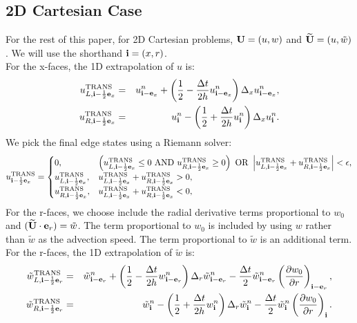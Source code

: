 \documentclass[11pt]{article}
\def\half  {\frac{1}{2}}
\def\dt    {\Delta t}
\def\trans {\rm TRANS}
\def\eb    {{\bf e}}
\def\ib    {{\bf i}}
\def\Ub    {{\bf U}}
\def\Ubt   {\widetilde{\bf U}}
\def\wt    {\tilde{w}}
\begin{document}
\subsection{2D Cartesian Case}
For the rest of this paper, for 2D Cartesian problems, $\Ub = (u,w)$ and $\Ubt = (u,\wt)$.  We will use the shorthand $\ib = (x,r)$.\\

For the x-faces, the 1D extrapolation of $u$ is:
\begin{eqnarray}
u_{L,\ib-\half\eb_x}^{\trans} &=& u_{\ib-\eb_x}^n + \left(\half - \frac{\dt}{2h}u_{\ib-\eb_x}^n\right)\Delta_x u_{\ib-\eb_x}^n, \\
u_{R,\ib-\half\eb_x}^{\trans} &=& u_{\ib}^n - \left(\half + \frac{\dt}{2h}u_{\ib}^n\right)\Delta_x u_{\ib}^n.
\end{eqnarray}
We pick the final edge states using a Riemann solver:
\begin{equation}
u^{\trans}_{\ib-\half\eb_x} =
\begin{cases}
0, & \left(u_{L,\ib-\half\eb_x}^{\trans} \le 0 ~ {\rm AND} ~ u_{R,\ib-\half\eb_x}^{\trans} \ge 0\right) ~ {\rm OR} ~ \left|u_{L,\ib-\half\eb_x}^{\trans} + u_{R,\ib-\half\eb_x}^{\trans}\right| < \epsilon, \\
u_{L,\ib-\half\eb_x}^{\trans}, & u_{L,\ib-\half\eb_x}^{\trans} + u_{R,\ib-\half\eb_x}^{\trans} > 0, \\
u_{R,\ib-\half\eb_x}^{\trans}, & u_{L,\ib-\half\eb_x}^{\trans} + u_{R,\ib-\half\eb_x}^{\trans} < 0, \\
\end{cases}
\end{equation}
For the r-faces, we choose include the radial derivative terms proportional to $w_0$ and $(\Ubt\cdot\eb_r) = \wt$.  The term proportional to $w_0$ is included by using $w$ rather than $\wt$ as the advection speed.  The term proportional to $\wt$ is an additional term.  For the r-faces, the 1D extrapolation of $\wt$ is:
\begin{eqnarray}
\wt_{L,\ib-\half\eb_r}^{\trans} &=& \wt_{\ib-\eb_r}^n + \left(\half - \frac{\dt}{2h}w_{\ib-\eb_r}^n\right)\Delta_r \wt_{\ib-\eb_r}^n - \frac{\dt}{2}\wt_{\ib-\eb_r}^n\left(\frac{\partial w_0}{\partial r}\right)_{\ib-\eb_r},\label{Radial utrans_L} \\
\wt_{R,\ib-\half\eb_r}^{\trans} &=& \wt_{\ib}^n - \left(\half + \frac{\dt}{2h}w_{\ib}^n\right)\Delta_r \wt_{\ib}^n - \frac{\dt}{2}\wt_{\ib}^n\left(\frac{\partial w_0}{\partial r}\right)_{\ib}.\label{Radial utrans_R}
\end{eqnarray}
\end{document}
